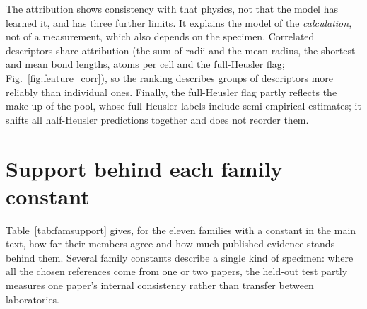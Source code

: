 \documentclass[preprint, 12pt]{elsarticle}
\begin{document}
The attribution shows consistency with that physics, not that the model has learned it, and has
three further limits. It explains the model of the \emph{calculation}, not of a measurement, which
also depends on the specimen. Correlated descriptors share attribution (the sum of radii and the
mean radius, the shortest and mean bond lengths, atoms per cell and the full-Heusler flag;
Fig.~\ref{fig:feature_corr}), so the ranking describes groups of descriptors more reliably than
individual ones. Finally, the full-Heusler flag partly reflects the make-up of the pool, whose
full-Heusler labels include semi-empirical estimates; it shifts all half-Heusler predictions
together and does not reorder them.

\section{Support behind each family constant}
\label{sec:famsupport}

Table~\ref{tab:famsupport} gives, for the eleven families with a constant in the main text, how far
their members agree and how much published evidence stands behind them. Several family constants
describe a single kind of specimen: where all the chosen references come from one or two papers, the
held-out test partly measures one paper's internal consistency rather than transfer between
laboratories.
\end{document}
